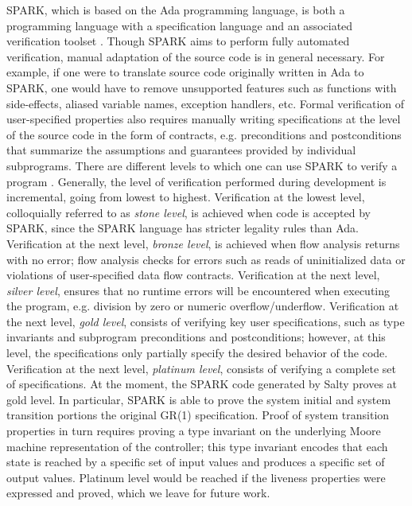 \documentclass[runningheads]{llncs}
\begin{document}
SPARK, which is based on the Ada programming language, is both a programming language 
with a specification language and an associated verification toolset \cite{hoang2015spark}.
Though SPARK aims to perform fully automated verification, manual adaptation of the source code is in general necessary. 
For example, if one were to translate source code originally written in Ada to SPARK, 
one would have to remove unsupported features such as functions with side-effects, aliased variable names, exception handlers, etc.  
Formal verification of user-specified properties also requires manually writing specifications at the level of the source code in the 
form of contracts, e.g. preconditions and postconditions that summarize the assumptions and guarantees provided by individual subprograms.
There are different levels to which one can use SPARK to verify a program \cite{moy2019climbing}. 
Generally, the level of verification performed during development is incremental, going from lowest to highest. 
Verification at the lowest level, colloquially referred to as \emph{stone level}, is achieved when code is accepted by SPARK, 
since the SPARK language has stricter legality rules than Ada. 
Verification at the next level, \emph{bronze level}, is achieved when flow analysis returns with no error; 
flow analysis checks for errors such as reads of uninitialized data or violations of user-specified data flow contracts. 
Verification at the next level, \emph{silver level}, ensures that no runtime errors will be encountered when executing the program, 
e.g. division by zero or numeric overflow/underflow. 
Verification at the next level, \emph{gold level}, consists of verifying key user specifications, such as 
type invariants and subprogram preconditions and postconditions; 
however, at this level, the specifications only partially specify the desired behavior of the code.  
Verification at the next level, \emph{platinum level}, consists of verifying a complete set of specifications.
At the moment, the SPARK code generated by Salty proves at gold level.
In particular, SPARK is able to prove the system initial and system transition portions the original GR(1) specification. 
Proof of system transition properties in turn requires proving a type invariant on the underlying Moore machine representation of the controller; 
this type invariant encodes that each state is reached by a specific set of input values and produces a specific set of output values. 
Platinum level would be reached if the liveness properties were expressed and proved, 
which we leave for future work.
\end{document}
